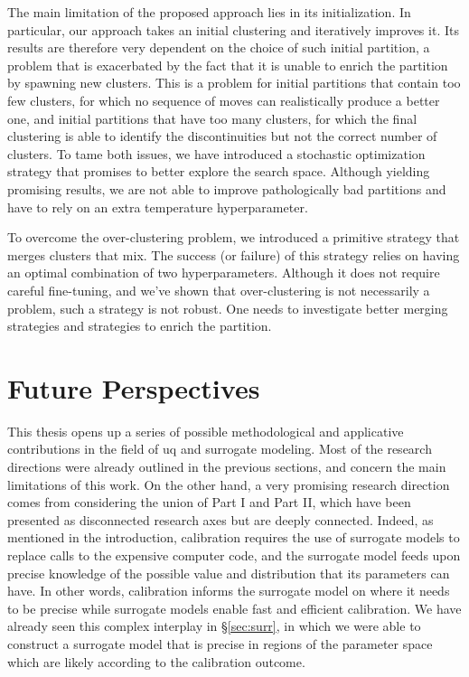 \smallskip
The main limitation of the proposed approach lies in its initialization. In particular, our approach takes an initial clustering and iteratively improves it. Its results are therefore very dependent on the choice of such initial partition, a problem that is exacerbated by the fact that it is unable to enrich the partition by spawning new clusters. This is a problem for initial partitions that contain too few clusters, for which no sequence of moves can realistically produce a better one, and initial partitions that have too many clusters, for which the final clustering is able to identify the discontinuities but not the correct number of clusters. To tame both issues, we have introduced a stochastic optimization strategy that promises to better explore the search space. Although yielding promising results, we are not able to improve pathologically bad partitions and have to rely on an extra temperature hyperparameter. 

\smallskip
To overcome the over-clustering problem, we introduced a primitive strategy that merges clusters that mix. The success (or failure) of this strategy relies on having an optimal combination of two hyperparameters. Although it does not require careful fine-tuning, and we've shown that over-clustering is not necessarily a problem, such a strategy is not robust. One needs to investigate better merging strategies and strategies to enrich the partition.


\section{Future Perspectives}

This thesis opens up a series of possible methodological and applicative contributions in the field of \gls{uq} and surrogate modeling. Most of the research directions were already outlined in the previous sections, and concern the main limitations of this work. On the other hand, a very promising research direction comes from considering the union of Part I and Part II, which have been presented as disconnected research axes but are deeply connected. Indeed, as mentioned in the introduction, calibration requires the use of surrogate models to replace calls to the expensive computer code, and the surrogate model feeds upon precise knowledge of the possible value and distribution that its parameters can have. In other words, calibration informs the surrogate model on where it needs to be precise while surrogate models enable fast and efficient calibration. We have already seen this complex interplay in \S\ref{sec:surr}, in which we were able to construct a surrogate model that is precise in regions of the parameter space which are likely according to the calibration outcome.

